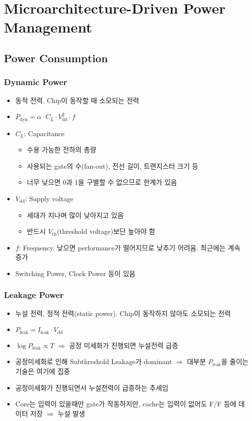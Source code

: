 \section{Microarchitecture-Driven Power Management}

\subsection{Power Consumption}

\subsubsection*{Dynamic Power}
\begin{itemize}
    \item 동적 전력. Chip이 동작할 때 소모되는 전력
    \item $P_{\mathrm{dyn}} = \alpha \cdot C_L \cdot V_{\mathrm{dd}}^2 \cdot f$
    \item $C_L$: Capacitance
    \begin{itemize}
        \item 수용 가능한 전하의 총량
        \item 사용되는 gate의 수(fan-out), 전선 길이, 트랜지스터 크기 등
        \item 너무 낮으면 0과 1을 구별할 수 없으므로 한계가 있음
    \end{itemize}
    \item $V_{\mathrm{dd}}$: Supply voltage
    \begin{itemize}
        \item 세대가 지나며 많이 낮아지고 있음
        \item 반드시 $V_{\mathrm{th}}$(threshold voltage)보단 높아야 함
    \end{itemize}    
    \item $f$: Frequency. 낮으면 performance가 떨어지므로 낮추기 어려움. 최근에는 계속 증가
    \item Switching Power, Clock Power 등이 있음
\end{itemize}

\subsubsection*{Leakage Power}
\begin{itemize}
    \item 누설 전력, 정적 전력(static power). Chip이 동작하지 않아도 소모되는 전력
    \item $P_{\mathrm{leak}} = I_{\mathrm{leak}} \cdot V_{\mathrm{dd}}$
    \item $\log P_{\mathrm{leak}} \varpropto T$ $\Rightarrow$ 공정 미세화가 진행되면 누설전력 급증
    \item 공정미세화로 인해 Subthreshold Leakage가 dominant $\Rightarrow$ 대부분 $P_{\mathrm{leak}}$을 줄이는 기술은 여기에 집중
    \item 공정미세화가 진행되면서 누설전력이 급증하는 추세임
    \item Core는 입력이 있을때만 gate가 작동하지만, cache는 입력이 없어도 F/F 등에 데이터 저장 $\Rightarrow$ 누설 발생
\end{itemize}
\pagebreak

